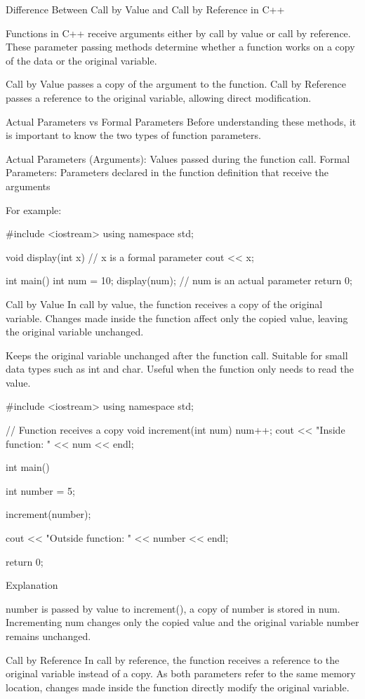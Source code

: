 Difference Between Call by Value and Call by Reference in C++

Functions in C++ receive arguments either by call by value or call by reference. These parameter passing methods determine whether a function works on a copy of the data or the original variable.

Call by Value passes a copy of the argument to the function.
Call by Reference passes a reference to the original variable, allowing direct modification.

Actual Parameters vs Formal Parameters
Before understanding these methods, it is important to know the two types of function parameters.

Actual Parameters (Arguments): Values passed during the function call.
Formal Parameters: Parameters declared in the function definition that receive the arguments

For example:




#include <iostream>
using namespace std;

void display(int x) {    // x is a formal parameter
    cout << x;
}

int main() {
    int num = 10;
    display(num);        // num is an actual parameter
    return 0;
}


Call by Value
In call by value, the function receives a copy of the original variable. Changes made inside the function affect only the copied value, leaving the original variable unchanged.

Keeps the original variable unchanged after the function call.
Suitable for small data types such as int and char.
Useful when the function only needs to read the value.

#include <iostream>
using namespace std;

// Function receives a copy
void increment(int num)
{
    num++;
    cout << "Inside function: " << num << endl;
}

int main()
{
    int number = 5;

    increment(number);

    cout << "Outside function: " << number << endl;

    return 0;
}

Explanation

number is passed by value to increment(), a copy of number is stored in num.
Incrementing num changes only the copied value and the original variable number remains unchanged.


Call by Reference
In call by reference, the function receives a reference to the original variable instead of a copy. As both parameters refer to the same memory location, changes made inside the function directly modify the original variable.

